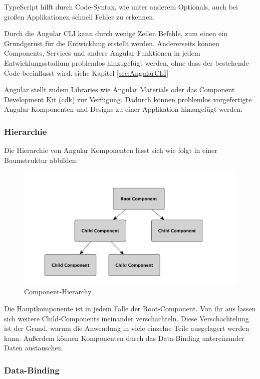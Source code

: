 TypeScript hilft durch Code-Syntax, wie unter anderem Optionals, auch bei großen Applikationen schnell Fehler zu erkennen. 

Durch die Angular CLI kann durch wenige Zeilen Befehle, zum einen ein Grundgerüst für die Entwicklung erstellt werden. Andererseits können Components, Services und andere Angular Funktionen in jedem Entwicklungsstadium problemlos hinzugefügt werden, ohne dass der bestehende Code beeinflusst wird. siehe Kapitel \ref{sec:AngularCLI}

Angular stellt zudem Libraries wie Angular Materials oder das Component Development Kit (cdk) zur Verfügung. Dadurch können problemlos vorgefertigte Angular Komponenten und Designs zu einer Applikation hinzugefügt werden.

\subsubsection{Hierarchie}
Die Hierarchie von Angular Komponenten lässt sich wie folgt in einer Baumstruktur abbilden:

\begin{figure}
    \centering
    \includegraphics[scale=0.6]{pics/hierarchy.PNG}
    \caption{Component-Hierarchy \cite{AngularBuch}}
    \label{fig:tech:front:component-hierarchy}
  \end{figure}
Die Hauptkomponente ist in jedem Falle der Root-Component. Von ihr aus lassen sich weitere Child-Components ineinander verschachteln. Diese Verschachtelung ist der Grund, warum die Anwendung in viele einzelne Teile ausgelagert werden kann. Außerdem können Komponenten durch das Data-Binding untereinander Daten austauschen.

\subsubsection{Data-Binding }


